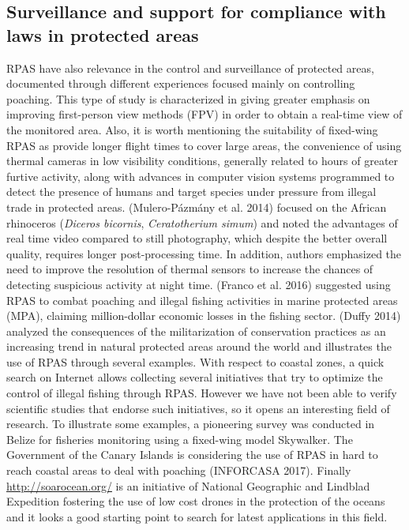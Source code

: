 \documentclass[]{interact}
\theoremstyle{plain}%
\theoremstyle{definition}
\theoremstyle{remark}
\begin{document}
\subsection{Surveillance and support for compliance with laws in
protected
areas}\label{surveillance-and-support-for-compliance-with-laws-in-protected-areas}

RPAS have also relevance in the control and surveillance of protected
areas, documented through different experiences focused mainly on
controlling poaching. This type of study is characterized in giving
greater emphasis on improving first-person view methods (FPV) in order
to obtain a real-time view of the monitored area. Also, it is worth
mentioning the suitability of fixed-wing RPAS as provide longer flight
times to cover large areas, the convenience of using thermal cameras in
low visibility conditions, generally related to hours of greater furtive
activity, along with advances in computer vision systems programmed to
detect the presence of humans and target species under pressure from
illegal trade in protected areas. (Mulero-Pázmány et al. 2014) focused
on the African rhinoceros (\emph{Diceros bicornis}, \emph{Ceratotherium
simum}) and noted the advantages of real time video compared to still
photography, which despite the better overall quality, requires longer
post-processing time. In addition, authors emphasized the need to
improve the resolution of thermal sensors to increase the chances of
detecting suspicious activity at night time. (Franco et al. 2016)
suggested using RPAS to combat poaching and illegal fishing activities
in marine protected areas (MPA), claiming million-dollar economic losses
in the fishing sector. (Duffy 2014) analyzed the consequences of the
militarization of conservation practices as an increasing trend in
natural protected areas around the world and illustrates the use of RPAS
through several examples. With respect to coastal zones, a quick search
on Internet allows collecting several initiatives that try to optimize
the control of illegal fishing through RPAS. However we have not been
able to verify scientific studies that endorse such initiatives, so it
opens an interesting field of research. To illustrate some examples, a
pioneering survey was conducted in Belize for fisheries monitoring using
a fixed-wing model Skywalker. The Government of the Canary Islands is
considering the use of RPAS in hard to reach coastal areas to deal with
poaching (INFORCASA 2017). Finally \url{http://soarocean.org/} is an
initiative of National Geographic and Lindblad Expedition fostering the
use of low cost drones in the protection of the oceans and it looks a
good starting point to search for latest applications in this field.
\end{document}

